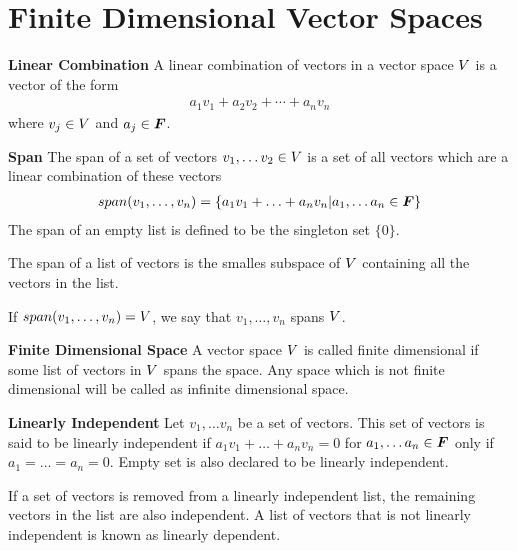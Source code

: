 \documentclass[../../linear_algebra.tex]{subfiles}
\begin{document}
\section{Finite Dimensional Vector Spaces}
\textbf{Linear Combination}\newline
A linear combination of vectors in a vector space $V$ is a vector of the form
\begin{align*}
    a_{1}v_{1} + a_{2}v_{2} + \cdots + a_{n}v_{n}
\end{align*}
where $v_{j} \in V$ and $a_{j} \in \bm{F}$.\newline

\textbf{Span}\newline
The span of a set of vectors $v_{1}, \ldots v_{2} \in V$ is a set of all vectors which are a linear combination of these vectors
\begin{align*}
    span(v_{1}, \ldots, v_{n}) = \{ a_{1}v_{1} + \ldots + a_{n}v_{n} | a_{1}, \ldots a_{n} \in \bm{F} \}
\end{align*}
The span of an empty list is defined to be the singleton set $\{ 0 \}$.\newline

The span of a list of vectors is the smalles subspace of $V$ containing all the vectors in the list.\newline

If $span(v_{1}, \ldots, v_{n}) = V$, we say that $v_{1}, \ldots, v_{n}$ spans $V$.\newline

\textbf{Finite Dimensional Space}\newline
A vector space $V$ is called finite dimensional if some list of vectors in $V$ spans the space. Any space which is not finite dimensional will be called as infinite dimensional space.\newline

\textbf{Linearly Independent}\newline
Let $v_{1}, \ldots v_{n}$ be a set of vectors. This set of vectors is said to be linearly independent if $a_{1}v_{1} + \ldots + a_{n}v_{n} = 0$ for $a_{1}, \ldots a_{n} \in \bm{F}$ only if $a_{1} = \ldots = a_{n} = 0$. Empty set is also declared to be linearly independent.\newline

If a set of vectors is removed from a linearly independent list, the remaining vectors in the list are also independent. A list of vectors that is not linearly independent is known as linearly dependent.\newline
\end{document}
